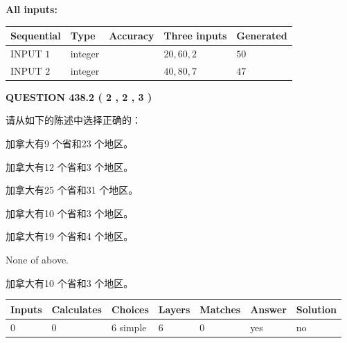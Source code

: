 \documentclass{ctexart}
\begin{document}
   
   
   
\noindent\vspace{0.1in}\hspace{-0.08in} {\textbf{\Large{All inputs: }}}
   
   
  
  
\noindent\begin{tabular}{|l|l|l|l|l|}
\hline
 Sequential & Type & Accuracy & Three inputs & Generated \\ 
\hline
 
 
  INPUT $  1 $ & integer &  & $
 20
 , 
 60
 , 
 2
 $ & $ 50 $ 
 \\  \hline  
 
 
  INPUT $  2 $ & integer &  & $
 40
 , 
 80
 , 
 7
 $ & $ 47 $ 
 \\  \hline  
 \end{tabular}
   
   
  
\vspace{0.2in}
  
{\textbf{\Large{QUESTION
438.2 
 ( 2 , 2 , 3 )
}}}
  
  
请从如下的陈述中选择正确的：
 
 
加拿大有9 个省和23 个地区。
 
 
加拿大有12 个省和3 个地区。
 
 
加拿大有25 个省和31 个地区。
 
 
加拿大有10 个省和3 个地区。
 
 
加拿大有19 个省和4 个地区。
 
 
 None of above.
 
 
\noindent{}
 
 
加拿大有10 个省和3 个地区。
 
 
\noindent{}
 
 
   
   
   
   
\noindent\begin{tabular}{|l|l|l|l|l|l|l|}
 \hline
Inputs & Calculates & Choices & Layers & Matches & Answer & Solution \\ \hline
 0  & 
 0  & 
 6
  simple  
  & 
 6  & 
 0  & 
  yes & 
  no 
  \\ \hline
 \end{tabular}
   
\end{document}

